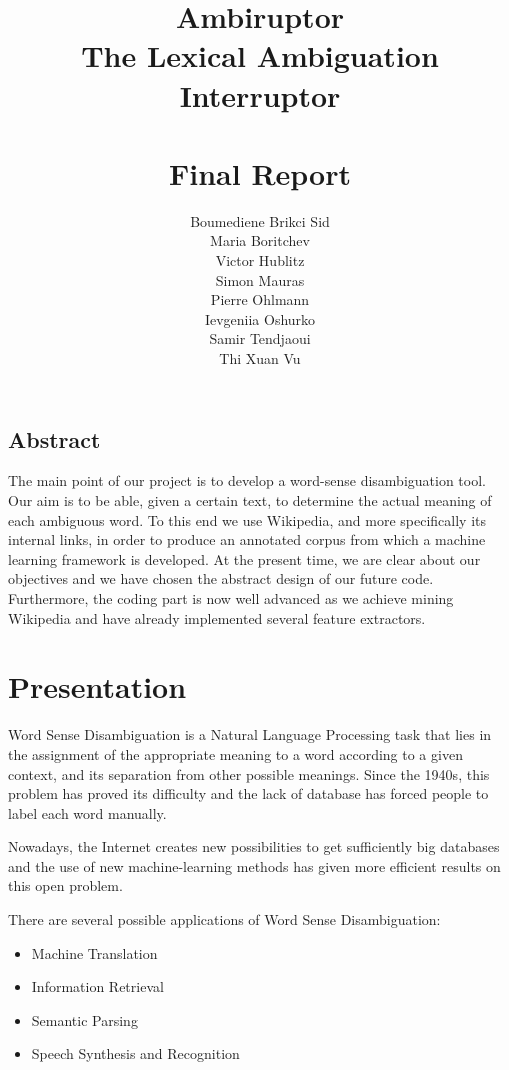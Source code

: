 \documentclass[11pt,a4paper]{article}
\title{\textbf{Ambiruptor}\\The Lexical Ambiguation
    Interruptor\\~\\Final Report}
\author{Boumediene Brikci Sid\\
         Maria Boritchev\\
         Victor Hublitz\\
         Simon Mauras\\
         Pierre Ohlmann\\
         Ievgeniia Oshurko\\
         Samir Tendjaoui\\
         Thi Xuan Vu}
\begin{document}
\maketitle

\vspace{2cm}
\subsection*{Abstract} 

The main point of our project is to develop a word-sense disambiguation tool. Our aim is to be able, given a certain text, to determine the actual meaning of each ambiguous word. To this end we use Wikipedia, and more specifically its internal links, in order to produce an annotated corpus from which a machine learning framework is developed. At the present time, we are clear about our objectives and we have chosen the abstract design of our future code. Furthermore, the coding part is now well advanced as we achieve mining Wikipedia and have already implemented several feature extractors.

\newpage

\tableofcontents

\newpage

\section{Presentation}

Word Sense Disambiguation is a Natural Language Processing task that lies in the assignment of the appropriate meaning to a word according to a given context, and its separation from other possible meanings. Since the 1940s, this problem has proved its difficulty and the lack of database has forced people to label each word manually.

Nowadays, the Internet creates new possibilities to get sufficiently big databases and the use of new machine-learning methods has given more efficient results on this open problem.    


\noindent There are several possible applications of Word Sense Disambiguation:
\begin{itemize}
	\item Machine Translation
	\item Information Retrieval
	\item Semantic Parsing
	\item Speech Synthesis and Recognition
\end{itemize}
\end{document}
